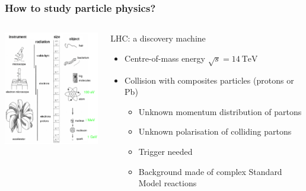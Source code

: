 \documentclass{beamer}
\begin{document}
    \begin{frame}
    \frametitle{How to study particle physics?}

    \begin{columns}[c]
      \begin{column}{5cm}
        \centering
        \includegraphics[width = 5cm]{Pictures/instrument.png}
      \end{column}
      
      \begin{column}{5cm}
        \begin{block}{LHC: a discovery machine}
          \begin{itemize}
            \item Centre-of-mass energy $\sqrt{s} = 14~\text{TeV}$
            \item Collision with composites particles (protons or Pb)
                \begin{itemize}
                    \item Unknown momentum distribution of partons
                    \item Unknown polarisation of colliding partons
                    \item Trigger needed
                    \item Background made of complex Standard Model reactions
                \end{itemize}
          \end{itemize}
        \end{block}
      \end{column}
    \end{columns}

  \end{frame}

\end{document}
